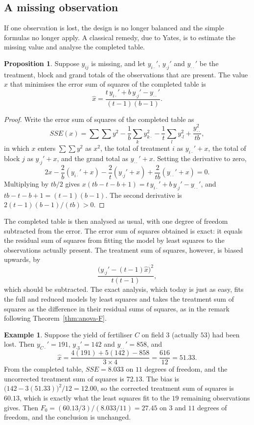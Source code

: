 \documentclass[11pt,a4paper]{article}
\numberwithin{equation}{section}
\theoremstyle{definition}
\newtheorem{exa}[thm]{Example}
\newtheorem{prop}[thm]{Proposition}
\begin{document}
\subsection{A missing observation}
If one observation is lost, the design is no longer balanced and the simple formulas no longer apply. A classical remedy, due to Yates, is to
estimate the missing value and analyse the completed table.

\begin{prop}\label{prop:missing}
Suppose $y_{ij}$ is missing, and let $y_{i\cdot}'$, $y_{\cdot j}'$ and $y_{\cdot\cdot}'$ be the treatment, block and grand totals of the observations that are present. The value $x$
that minimises the error sum of squares of the completed table is
\[
\hat x = \frac{t\,y_{i\cdot}' + b\,y_{\cdot j}' - y_{\cdot\cdot}'}{(t - 1)(b - 1)} .
\]
\end{prop}

\begin{proof}
Write the error sum of squares of the completed table as
\[
SSE(x) = \sum\sum y^2 - \frac1b\sum_ky_{k\cdot}^2 - \frac1t\sum_ly_{\cdot l}^2 + \frac{y_{\cdot\cdot}^2}{tb} ,
\]
in which $x$ enters $\sum\sum y^2$ as $x^2$, the total of treatment $i$ as $y_{i\cdot}' + x$, the total of block $j$ as $y_{\cdot j}' + x$, and the grand total as $y_{\cdot\cdot}' + x$. Setting the
derivative to zero,
\[
2x - \frac2b(y_{i\cdot}' + x) - \frac2t(y_{\cdot j}' + x) + \frac{2}{tb}(y_{\cdot\cdot}' + x) = 0 .
\]
Multiplying by $tb/2$ gives $x(tb - t - b + 1) = t\,y_{i\cdot}' + b\,y_{\cdot j}' - y_{\cdot\cdot}'$, and $tb - t - b + 1 = (t - 1)(b - 1)$. The second derivative is $2(t - 1)(b - 1)/(tb) > 0$.
\end{proof}

The completed table is then analysed as usual, with one degree of freedom subtracted from the error. The error sum of squares obtained is exact:
it equals the residual sum of squares from fitting the model by least squares to the observations actually present. The treatment sum of
squares, however, is biased upwards, by
\[
\frac{\bigl(y_{\cdot j}' - (t - 1)\hat x\bigr)^2}{t(t - 1)} ,
\]
which should be subtracted. The exact analysis, which today is just as easy, fits the full and reduced models by least squares and takes the
treatment sum of squares as the difference in their residual sums of squares, as in the remark following Theorem~\ref{thm:anova-F}.

\begin{exa}
Suppose the yield of fertiliser $C$ on field $3$ (actually $53$) had been lost. Then $y_{C\cdot}' = 191$, $y_{\cdot 3}' = 142$ and $y_{\cdot\cdot}' = 858$, and
\[
\hat x = \frac{4(191) + 5(142) - 858}{3 \times 4} = \frac{616}{12} = 51.33 .
\]
From the completed table, $SSE = 8.033$ on $11$ degrees of freedom, and the uncorrected treatment sum of squares is $72.13$. The bias is
$\bigl(142 - 3(51.33)\bigr)^2/12 = 12.00$, so the corrected treatment sum of squares is $60.13$, which is exactly what the least squares fit to the $19$ remaining
observations gives. Then $F_0 = (60.13/3)/(8.033/11) = 27.45$ on $3$ and $11$ degrees of freedom, and the conclusion is unchanged.
\end{exa}
\end{document}
